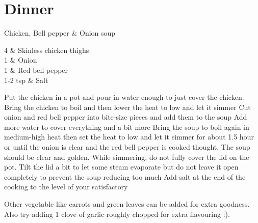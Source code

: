 \chapter{Dinner}
\begin{recipe}
[ %
	preparationtime = {\unit[2]{hrs}},
	portion = \portion{2},
	source = D. Pattanakul
]
{{Chicken, Bell pepper \& Onion soup}}
	
	
	\ingredients
	{   
	    4 & Skinless chicken thighs\\
	    1 & Onion\\
		1 & Red bell pepper\\
		1-2 tsp & Salt \\
	}
	
	\preparation 
	{
	    \step Put the chicken in a pot and pour in water enough to just cover the chicken. Bring the chicken to boil and then lower the heat to low and let it simmer
	    \step Cut onion and red bell pepper into bite-size pieces and add them to the soup
	    \step Add more water to cover everything and a bit more
	    \step Bring the soup to boil again in medium-high heat then set the heat to low and let it simmer for about 1.5 hour or until the onion is clear and the red bell pepper is cooked thought. The soup should be clear and golden. While simmering, do not fully cover the lid on the pot. Tilt the lid a bit to let some steam evaporate but do not leave it open completely to prevent the soup reducing too much
	    \step Add salt at the end of the cooking to the level of your satisfactory
	}
	
	\hint
	{%
		Other vegetable like carrots and green leaves can be added for extra goodness. Also try adding 1 clove of garlic roughly chopped for extra flavouring :).
	}

\end{recipe}
